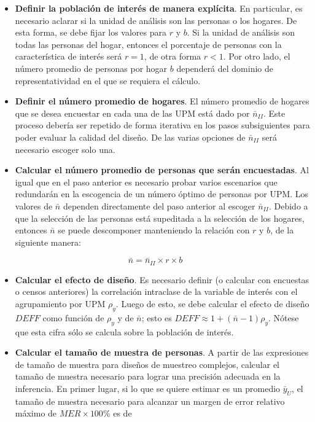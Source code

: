 \documentclass[
  12pt,
]{book}
\begin{document}
\begin{itemize}
\item
  \textbf{Definir la población de interés de manera explícita}. En particular, es necesario aclarar si la unidad de análisis son las personas o los hogares. De esta forma, se debe fijar los valores para \(r\) y \(b\). Si la unidad de análisis son todas las personas del hogar, entonces el porcentaje de personas con la característica de interés será \(r = 1\), de otra forma \(r<1\). Por otro lado, el número promedio de personas por hogar \(b\) dependerá del dominio de representatividad en el que se requiera el cálculo.
\item
  \textbf{Definir el número promedio de hogares}. El número promedio de hogares que se desea encuestar en cada una de las UPM está dado por \(\bar{n}_{II}\). Este proceso debería ser repetido de forma iterativa en los pasos subsiguientes para poder evaluar la calidad del diseño. De las varias opciones de \(\bar{n}_{II}\) será necesario escoger solo una.
\item
  \textbf{Calcular el número promedio de personas que serán encuestadas}. Al igual que en el paso anterior es necesario probar varios escenarios que redundarán en la escogencia de un número óptimo de personas por UPM. Los valores de \(\bar{n}\) dependen directamente del paso anterior al escoger \(\bar{n}_{II}\). Debido a que la selección de las personas está supeditada a la selección de los hogares, entonces \(\bar{n}\) se puede descomponer manteniendo la relación con \(r\) y \(b\), de la siguiente manera:
\end{itemize}

\[
\bar{n} = \bar{n}_{II} \times r \times b
\]

\begin{itemize}
\item
  \textbf{Calcular el efecto de diseño}. Es necesario definir (o calcular con encuestas o censos anteriores) la correlación intraclase de la variable de interés con el agrupamiento por UPM \(\rho_y\). Luego de esto, se debe calcular el efecto de diseño \(DEFF\) como función de \(\rho_y\) y de \(\bar{n}\); esto es \(DEFF \approx 1 + (\bar{n} - 1)\rho_y\). Nótese que esta cifra sólo se calcula sobre la población de interés.
\item
  \textbf{Calcular el tamaño de muestra de personas}. A partir de las expresiones de tamaño de muestra para diseños de muestreo complejos, calcular el tamaño de muestra necesario para lograr una precisión adecuada en la inferencia. En primer lugar, si lo que se quiere estimar es un promedio \(\bar{y}_U\), el tamaño de muestra necesario para alcanzar un margen de error relativo máximo de \(MER \times 100\%\) es de
\end{itemize}
\end{document}
